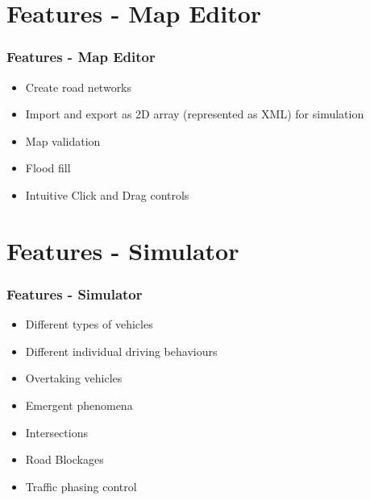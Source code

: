 \documentclass{beamer}
\begin{document}
\section{Features - Map Editor}

\begin{frame}
\frametitle{Features - Map Editor}
	\begin{itemize}
		\item Create road networks
		\item Import and export as 2D array (represented as XML) for simulation 
		\item Map validation 
		\item Flood fill
		\item Intuitive Click and Drag controls 
	\end{itemize}


\end{frame}

\section{Features - Simulator}

\begin{frame}
\frametitle{Features - Simulator}
	\begin{itemize}
		\item Different types of vehicles
		\item Different individual driving behaviours 
		\item Overtaking vehicles
		\item Emergent phenomena
		\item Intersections  
		\item Road Blockages
		\item Traffic phasing control
	\end{itemize}

\end{frame}
\end{document}
